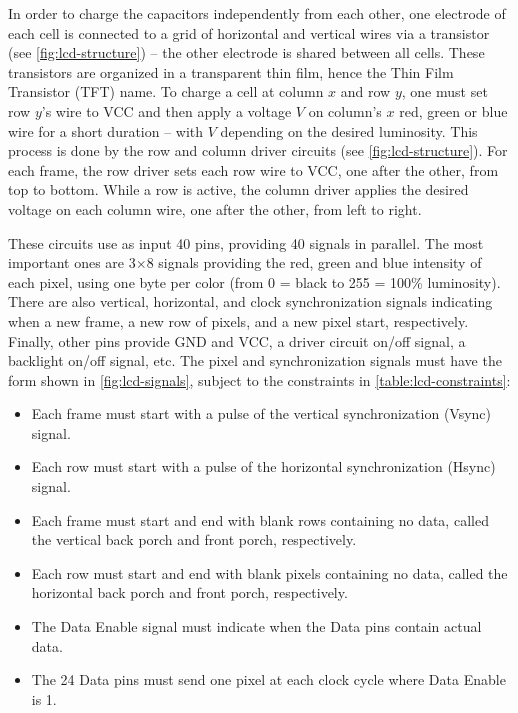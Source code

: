 In order to charge the capacitors independently from each other, one electrode
of each cell is connected to a grid of horizontal and vertical wires via a
transistor (see \cref{fig:lcd-structure}) -- the other electrode is shared
between all cells. These transistors are organized in a transparent thin film,
hence the Thin Film Transistor (TFT) name. To charge a cell at column $x$ and
row $y$, one must set row $y$'s wire to VCC and then apply a voltage $V$ on
column's $x$ red, green or blue wire for a short duration -- with $V$ depending
on the desired luminosity. This process is done by the row and column driver
circuits (see \cref{fig:lcd-structure}). For each frame, the row driver sets
each row wire to VCC, one after the other, from top to bottom. While a row is
active, the column driver applies the desired voltage on each column wire, one
after the other, from left to right.

These circuits use as input 40 pins, providing 40 signals in parallel. The most
important ones are 3$\times$8 signals providing the red, green and blue
intensity of each pixel, using one byte per color (from 0 = black to 255 =
100\% luminosity). There are also vertical, horizontal, and clock
synchronization signals indicating when a new frame, a new row of pixels, and a
new pixel start, respectively. Finally, other pins provide GND and VCC, a
driver circuit on/off signal, a backlight on/off signal, etc. The pixel and
synchronization signals must have the form shown in \cref{fig:lcd-signals},
subject to the constraints in \cref{table:lcd-constraints}:
\begin{itemize}
  \item Each frame must start with a pulse of the vertical synchronization
  (Vsync) signal.

  \item Each row must start with a pulse of the horizontal synchronization
  (Hsync) signal.

  \item Each frame must start and end with blank rows containing no data,
  called the vertical back porch and front porch, respectively.

  \item Each row must start and end with blank pixels containing no data,
  called the horizontal back porch and front porch, respectively.

  \item The Data Enable signal must indicate when the Data pins contain actual
  data.

  \item The 24 Data pins must send one pixel at each clock cycle where Data
  Enable is 1.
\end{itemize}

